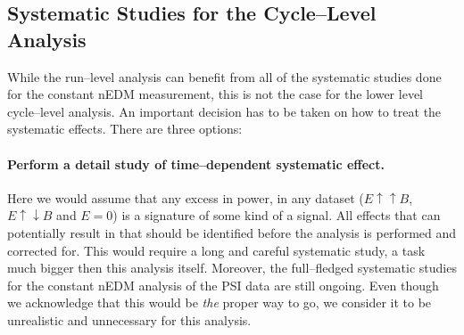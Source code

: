 

\subsection{Systematic Studies for the Cycle--Level Analysis}
While the run--level analysis can benefit from all of the systematic studies done for the constant nEDM measurement, this is not the case for the lower level cycle--level analysis. An important decision has to be taken on how to treat the systematic effects. There are three options:

\paragraph{Perform a detail study of time--dependent systematic effect.}
Here we would assume that any excess in power, in any dataset ($E \uparrow \uparrow B$, $E \uparrow \downarrow B$ and $E=0$) is a signature of some kind of a signal. All effects that can potentially result in that should be identified before the analysis is performed and corrected for. This would require a long and careful systematic study, a task much bigger then this analysis itself. Moreover, the full--fledged systematic studies for the constant nEDM analysis of the PSI data are still ongoing. Even though we acknowledge that this would be \emph{the} proper way to go, we consider it to be unrealistic and unnecessary for this analysis.

